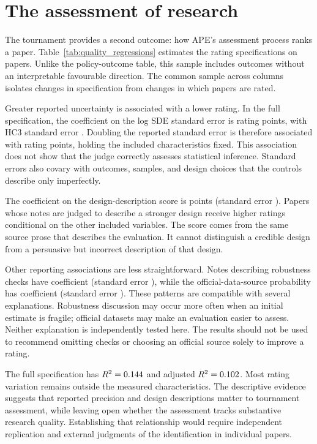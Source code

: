 \documentclass[11pt]{article}
\begin{document}
\section{The assessment of research}\label{sec:ratings}
The tournament provides a second outcome: how APE's assessment process ranks a paper. Table~\ref{tab:quality_regressions} estimates the rating specifications on \QualityN{} papers. Unlike the policy-outcome table, this sample includes outcomes without an interpretable favourable direction. The common sample across columns isolates changes in specification from changes in which papers are rated.



Greater reported uncertainty is associated with a lower rating. In the full specification, the coefficient on the log SDE standard error is \QualityPrecision{} rating points, with HC3 standard error \QualityPrecisionSE{}. Doubling the reported standard error is therefore associated with \PrecisionDoubling{} rating points, holding the included characteristics fixed. This association does not show that the judge correctly assesses statistical inference. Standard errors also covary with outcomes, samples, and design choices that the controls describe only imperfectly.

The coefficient on the design-description score is \QualityDesign{} points (standard error \QualityDesignSE{}). Papers whose notes are judged to describe a stronger design receive higher ratings conditional on the other included variables. The score comes from the same source prose that describes the evaluation. It cannot distinguish a credible design from a persuasive but incorrect description of that design.

Other reporting associations are less straightforward. Notes describing robustness checks have coefficient \QualityRobustness{} (standard error \QualityRobustnessSE{}), while the official-data-source probability has coefficient \QualityOfficial{} (standard error \QualityOfficialSE{}). These patterns are compatible with several explanations. Robustness discussion may occur more often when an initial estimate is fragile; official datasets may make an evaluation easier to assess. Neither explanation is independently tested here. The results should not be used to recommend omitting checks or choosing an official source solely to improve a rating.

The full specification has $R^2=0.144{}$ and adjusted $R^2=0.102{}$. Most rating variation remains outside the measured characteristics. The descriptive evidence suggests that reported precision and design descriptions matter to tournament assessment, while leaving open whether the assessment tracks substantive research quality. Establishing that relationship would require independent replication and external judgments of the identification in individual papers.
\end{document}
